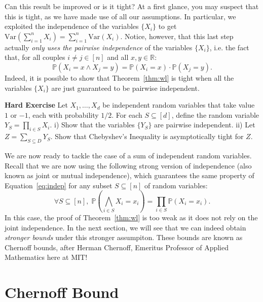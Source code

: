 \documentclass[10pt]{article}
\renewcommand{\Pr}{\mathbb{P}}
\begin{document}
Can this result be improved or is it tight? At a first glance, you may
suspect that this is tight, as we have made use of all our
assumptions. In particular, we exploited the independence of the
variables $\{X_i\}$ to get $\mathrm{Var}(\sum_{i=1}^n X_i) = \sum_{i=1}^n
\mathrm{Var}(X_i).$ Notice, however, that this last step actually \emph{only
uses the pairwise independence } of the variables $\{X_i\}$,
i.e. the fact that, for all couples $i \neq j \in [n]$ and all $x,y
\in \mathbb{R}$:
\begin{equation} \label{eq:indep}
\Pr(X_i = x \wedge X_j = y) = \Pr(X_i = x) \cdot \Pr(X_j = y).
\end{equation}
Indeed, it is possible to show that Theorem~\ref{thm:wl} is tight when
all the variables $\{X_i\}$ are just guaranteed to be pairwise
independent.

{\bf Hard Exercise} Let $X_1, \ldots, X_d$ be independent random variables
that take value $1$ or $-1$, each with probability $1/2.$
For each $S \subseteq [d]$, define the random variable  $Y_S =
\prod_{i \in S} X_i$. i) Show that the variables $\{Y_S\}$ are pairwise
independent. ii) Let $Z = \sum_{S \subseteq D} Y_S.$ Show that
Chebyshev's Inequality is asymptotically tight for $Z.$

We are now ready to tackle the case of a sum of independent random
variables. Recall that we are now using the following strong version of
independence (also known as joint or mutual independence), which
guarantees the same property of Equation~\ref{eq:indep} for any subset $S
\subseteq [n]$ of random variables:
$$
\forall S \subseteq [n], \; \Pr(\bigwedge_{i \in S} X_i = x_i) =
\prod_{i \in S} \Pr(X_i = x_i).
$$
In this case, the proof of Theorem~\ref{thm:wl} is too weak as it does
not rely on the joint independence. In the next section, we will see
that we can indeed obtain \emph{stronger bounds} under this stronger
assumpiton. 
These bounds are known as Chernoff bounds, after Herman Chernoff, Emeritus Professor of
Applied Mathematics here at MIT!

\section{Chernoff Bound}
\end{document}
